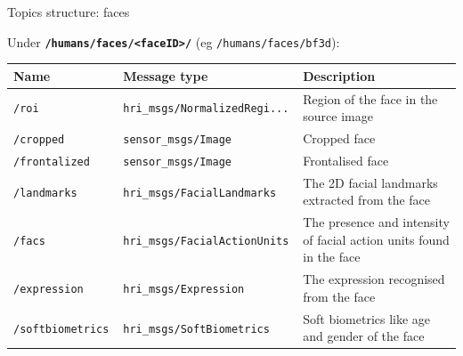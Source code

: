 \documentclass[xcolor=table]{beamer}
\begin{document}
\begin{frame}{Topics structure: faces}

    Under \textbf{\texttt{/humans/faces/<faceID>/}} (eg \texttt{/humans/faces/bf3d}):

    \scriptsize
    \begin{tabular}{@{}llp{4cm}@{}}
        \toprule
\textbf{Name} & \textbf{Message type}         & \textbf{Description}                                                \\ \midrule
        \texttt{/roi       }   & \texttt{hri\_msgs/NormalizedRegi...} & Region of the face in the source image                              \\
        \texttt{/cropped       }   & \texttt{sensor\_msgs/Image} & Cropped face                              \\
        \texttt{/frontalized       }   & \texttt{sensor\_msgs/Image} & Frontalised face                              \\
        \texttt{/landmarks }   & \texttt{hri\_msgs/FacialLandmarks    } & The 2D facial landmarks extracted from the face                     \\
        \texttt{/facs      }   & \texttt{hri\_msgs/FacialActionUnits  } & The presence and intensity of facial action units found in the face \\
        \texttt{/expression}   & \texttt{hri\_msgs/Expression         } & The expression recognised from the face           \\
        \texttt{/softbiometrics      } & \texttt{hri\_msgs/SoftBiometrics }  &   Soft biometrics like age and gender of the face                                       \\  \bottomrule               
\end{tabular}
    
\end{frame}
\end{document}
